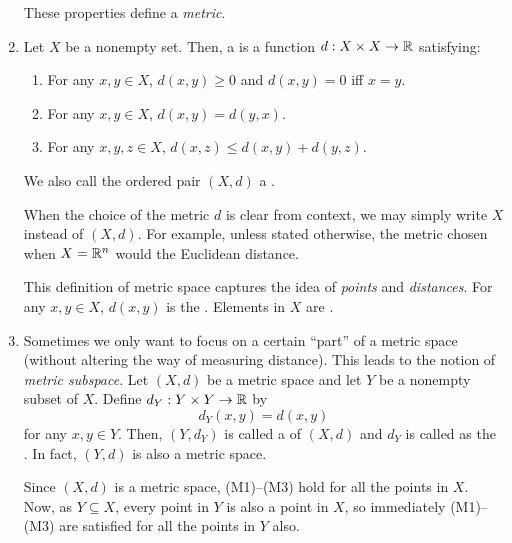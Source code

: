 \begin{enumerate}
\begin{itemize}
\begin{center}
\end{center}
\end{itemize}
These properties define a \emph{metric}.
\item Let \(X\) be a nonempty set. Then, a  is a function
\(d:X\times X\to\mathbb{R}\) satisfying:
\begin{enumerate}[label={(M\arabic*)}]
\item For any \(x,y\in X\), \(d(x,y)\ge 0\) and \(d(x,y)=0\) iff \(x=y\).
\item For any \(x,y\in X\), \(d(x,y)=d(y,x)\).
\item For any \(x,y,z\in X\), \(d(x,z)\le d(x,y)+d(y,z)\).
\end{enumerate}
We also call the ordered pair \((X,d)\) a .

\begin{note}
When the choice of the metric \(d\) is clear from context, we may simply write
\(X\) instead of \((X,d)\). For example, unless stated otherwise, the metric
chosen when \(X=\mathbb{R}^n\) would the Euclidean distance.
\end{note}

This definition of metric space captures the idea of \emph{points} and
\emph{distances}. For any \(x,y\in X\), \(d(x,y)\) is the . Elements in \(X\) are
.

\item Sometimes we only want to focus on a certain ``part'' of a metric space
(without altering the way of measuring distance). This leads to the notion of
\emph{metric subspace}. Let \((X,d)\) be a metric space and let \(Y\) be a
nonempty subset of \(X\). Define \(d_Y:Y\times  Y\to \mathbb{R}\) by
\[
d_Y(x,y)=d(x,y)
\]
for any \(x,y\in Y\). Then, \((Y,d_Y)\) is called a  of
\((X,d)\) and \(d_Y\) is called as the . In fact, \((Y,d)\) is also a metric space.

\begin{pf}
Since \((X,d)\) is a metric space, (M1)--(M3) hold for all the points in \(X\).
Now, as \(Y\subseteq X\), every point in \(Y\) is also a point in \(X\), so
immediately (M1)--(M3) are satisfied for all the points in \(Y\) also.
\end{pf}
\end{enumerate}
